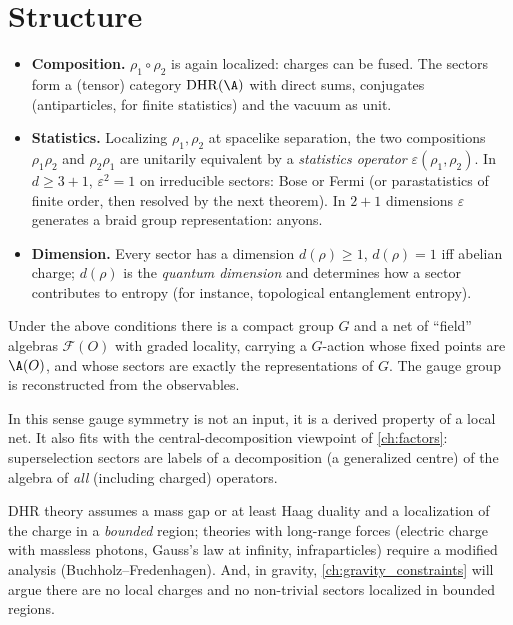 \section{Structure}
\begin{itemize}
\item \textbf{Composition.} $\rho_1\circ\rho_2$ is again localized: charges can be fused. The sectors form a (tensor) category $\mathrm{DHR}(\A)$ with direct sums, conjugates (antiparticles, for finite statistics) and the vacuum as unit.
\item \textbf{Statistics.} Localizing $\rho_1,\rho_2$ at spacelike separation, the two compositions $\rho_1\rho_2$ and $\rho_2\rho_1$ are unitarily equivalent by a \emph{statistics operator} $\varepsilon(\rho_1,\rho_2)$. In $d\ge3+1$, $\varepsilon^2=1$ on irreducible sectors: Bose or Fermi (or parastatistics of finite order, then resolved by the next theorem). In $2+1$ dimensions $\varepsilon$ generates a braid group representation: anyons.
\item \textbf{Dimension.} Every sector has a dimension $d(\rho)\ge1$, $d(\rho)=1$ iff abelian charge; $d(\rho)$ is the \emph{quantum dimension} and determines how a sector contributes to entropy (for instance, topological entanglement entropy).
\end{itemize}

\begin{theorem}
Under the above conditions there is a compact group $G$ and a net of ``field'' algebras $\mathcal F(O)$ with graded locality, carrying a $G$-action whose fixed points are $\A(O)$, and whose sectors are exactly the representations of $G$. The gauge group is reconstructed from the observables.
\end{theorem}

In this sense gauge symmetry is not an input, it is a derived property of a local net. It also fits with the central-decomposition viewpoint of \cref{ch:factors}: superselection sectors are labels of a decomposition (a generalized centre) of the algebra of \emph{all} (including charged) operators.

\begin{whatwrong}
DHR theory assumes a mass gap or at least Haag duality and a localization of the charge in a \emph{bounded} region; theories with long-range forces (electric charge with massless photons, Gauss's law at infinity, infraparticles) require a modified analysis (Buchholz--Fredenhagen). And, in gravity, \cref{ch:gravity_constraints} will argue there are no local charges and no non-trivial sectors localized in bounded regions.
\end{whatwrong}

